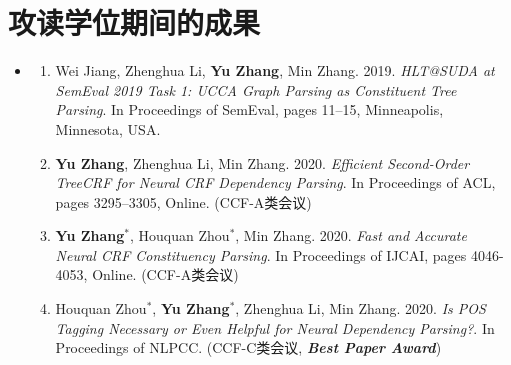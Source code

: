 \chapter{攻读学位期间的成果}

\begin{itemize}
    \setlength{\itemsep}{5pt}
          
    \item \textbf{\heiti{}}
          
          \begin{enumerate}
              \setlength{\itemsep}{-\itemsep}  %
                    
              \item Wei Jiang, Zhenghua Li, \textbf{Yu Zhang}, Min Zhang. 2019.
                    \emph{HLT@SUDA at SemEval 2019 Task 1: UCCA Graph Parsing as Constituent Tree Parsing}.
                    In Proceedings of SemEval, pages 11–15, Minneapolis, Minnesota, USA.
                    
              \item \textbf{Yu Zhang}, Zhenghua Li, Min Zhang. 2020.
                    \emph{Efficient Second-Order TreeCRF for Neural CRF Dependency Parsing}.
                    In Proceedings of ACL, pages 3295–3305, Online. (CCF-A类会议)
                    
              \item \textbf{Yu Zhang}$^\ast$, Houquan Zhou$^\ast$, Min Zhang. 2020.
                    \emph{Fast and Accurate Neural CRF Constituency Parsing}.
                    In Proceedings of IJCAI, pages 4046-4053, Online. (CCF-A类会议)
                    
              \item Houquan Zhou$^\ast$, \textbf{Yu Zhang}$^\ast$, Zhenghua Li, Min Zhang. 2020.
                    \emph{Is POS Tagging Necessary or Even Helpful for Neural Dependency Parsing?}.
                    In Proceedings of NLPCC. (CCF-C类会议, \textbf{\textit{Best Paper Award}})
                    

\end{enumerate}
\end{itemize}
